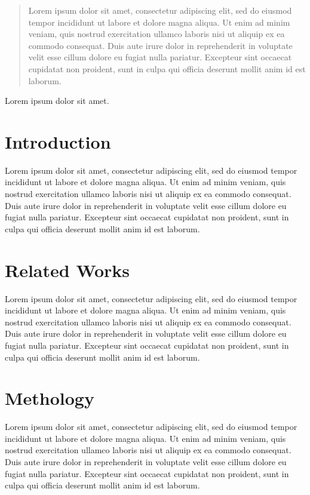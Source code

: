 \documentclass{MasterThesis}
\begin{document}
\begin{abstract}
Lorem ipsum dolor sit amet, consectetur adipiscing elit, sed do eiusmod tempor incididunt ut labore et dolore magna aliqua. 
Ut enim ad minim veniam, quis nostrud exercitation ullamco laboris nisi ut aliquip ex ea commodo consequat. 
Duis aute irure dolor in reprehenderit in voluptate velit esse cillum dolore eu fugiat nulla pariatur. 
Excepteur sint occaecat cupidatat non proident, sunt in culpa qui officia deserunt mollit anim id est laborum.
\end{abstract}

\begin{keywords}
Lorem ipsum dolor sit amet. 
\end{keywords}

\newpage
\tableofcontents

\newpage
\listoffigures

\newpage
\listoftables

\newpage
\section{Introduction}
Lorem ipsum dolor sit amet, consectetur adipiscing elit, sed do eiusmod tempor incididunt ut labore et dolore magna aliqua. 
Ut enim ad minim veniam, quis nostrud exercitation ullamco laboris nisi ut aliquip ex ea commodo consequat. 
Duis aute irure dolor in reprehenderit in voluptate velit esse cillum dolore eu fugiat nulla pariatur. 
Excepteur sint occaecat cupidatat non proident, sunt in culpa qui officia deserunt mollit anim id est laborum.

\newpage
\section{Related Works}
Lorem ipsum dolor sit amet, consectetur adipiscing elit, sed do eiusmod tempor incididunt ut labore et dolore magna aliqua. 
Ut enim ad minim veniam, quis nostrud exercitation ullamco laboris nisi ut aliquip ex ea commodo consequat. 
Duis aute irure dolor in reprehenderit in voluptate velit esse cillum dolore eu fugiat nulla pariatur. 
Excepteur sint occaecat cupidatat non proident, sunt in culpa qui officia deserunt mollit anim id est laborum.

\newpage
\section{Methology}

Lorem ipsum dolor sit amet, consectetur adipiscing elit, sed do eiusmod tempor incididunt ut labore et dolore magna aliqua. 
Ut enim ad minim veniam, quis nostrud exercitation ullamco laboris nisi ut aliquip ex ea commodo consequat. 
Duis aute irure dolor in reprehenderit in voluptate velit esse cillum dolore eu fugiat nulla pariatur. 
Excepteur sint occaecat cupidatat non proident, sunt in culpa qui officia deserunt mollit anim id est laborum.
\end{document}
